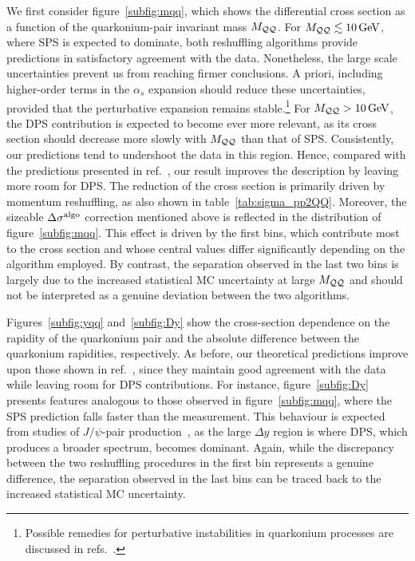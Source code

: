 We first consider figure~\ref{subfig:mqq}, which shows the differential cross section as a function of the quarkonium-pair invariant mass $M_{\cal QQ}$. For $M_{\cal QQ} \lesssim 10\,{\rm GeV}$, where SPS is expected to dominate, both reshuffling algorithms provide predictions in satisfactory agreement with the data.
Nonetheless, the large scale uncertainties prevent us from reaching firmer conclusions. A priori, including higher-order terms in the $\alpha_s$ expansion should reduce these uncertainties, provided that the perturbative expansion remains stable.\footnote{Possible remedies for perturbative instabilities in quarkonium processes are discussed in refs.~\cite{Shao:2018adj,Maxia:2026fbz}.}
For $M_{\cal QQ} > 10\,{\rm GeV}$, the DPS contribution is expected to become ever more relevant, as its cross section should decrease more slowly with $M_{\cal QQ}$ than that of SPS. Consistently, our predictions tend to undershoot the data in this region. Hence, compared with the predictions presented in ref.~\cite{LHCb:2023wsl}, our result improves the description by leaving more room for DPS. The reduction of the cross section is primarily driven by momentum reshuffling, as also shown in table~\ref{tab:sigma_pp2QQ}.
Moreover, the sizeable $\Delta \sigma^{\rm algo}$ correction mentioned above  is reflected in the distribution of figure~\ref{subfig:mqq}. This effect is driven by the first bins, which contribute most to the cross section and whose central values differ significantly depending on the algorithm employed. By contrast, the separation observed in the last two bins is largely due to the increased statistical MC uncertainty at large $M_{\cal QQ}$ and should not be interpreted as a genuine deviation between the two algorithms.

Figures~\ref{subfig:yqq} and~\ref{subfig:Dy} show the cross-section dependence on the rapidity of the quarkonium pair and the absolute difference between the quarkonium rapidities, respectively. As before, our theoretical predictions improve upon those shown in ref.~\cite{LHCb:2023wsl}, since they maintain good agreement with the data while leaving room for DPS contributions. For instance, figure~\ref{subfig:Dy} presents features analogous to those observed in figure~\ref{subfig:mqq}, where the SPS prediction falls faster than the measurement. This behaviour is expected from studies of $J/\psi$-pair production~\cite{Kom:2011bd,Lansberg:2014swa}, as the large $\Delta y$ region is where DPS, which produces a broader spectrum, becomes dominant. Again, while the discrepancy between the two reshuffling procedures in the first bin represents a genuine difference, the separation observed in the last bins can be traced back to the increased statistical MC uncertainty.

